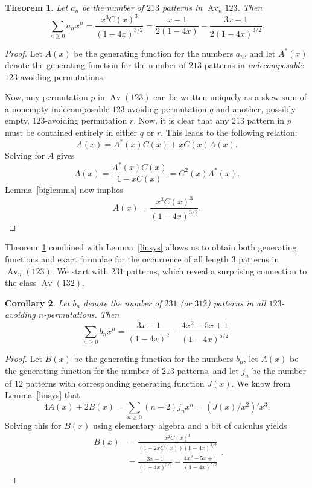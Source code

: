 \documentclass[11pt]{article} %
\theoremstyle{plain}
\newtheorem{theorem}{Theorem}
\newtheorem{corollary}[theorem]{Corollary}
\theoremstyle{definition}
\newcommand{\Avn}{\Av_n(123)}
\DeclareMathOperator{\Av}{Av}
\begin{document}
  \begin{theorem} \label{213pats}
    Let $a_n$ be the number of $213$ patterns in $\Av_n 123$. Then
    $$ \sum_{n\geq 0} a_n x^n = \frac{x^3C(x)^3}{(1-4x)^{3/2}} =
        \frac{x-1}{2(1-4x)} - \frac{3x-1}{2(1-4x)^{3/2}}.$$
  \end{theorem}
  \begin{proof}
    Let $A(x)$ be the generating function for the numbers $a_n$, and
    let $A^*(x)$
    denote the generating function for the number of $213$ patterns in
    \emph{indecomposable} $123$-avoiding permutations.

    Now, any permutation $p$ in $\Av(123)$ can be written uniquely as a
    skew sum of a nonempty indecomposable $123$-avoiding
    permutation $q$ and another, possibly empty, $123$-avoiding
    permutation $r$. Now, it is clear that any $213$ pattern in $p$
    must be contained entirely in either $q$ or $r$. This leads to
    the following relation:
    $$ A(x) = A^*(x)C(x) + xC(x)A(x).$$
    Solving for $A$ gives
    $$ A(x) = \frac{A^*(x) C(x)}{1-xC(x)} = C^2(x) A^*(x).$$
    Lemma~\ref{biglemma} now implies
    $$ A(x) = \frac{x^3 C(x)^3}{(1-4x)^{3/2}}.$$
  \end{proof}

  Theorem~\ref{213pats} combined with Lemma~\ref{linsys} allows us to
  obtain both generating functions and exact formulae for the
  occurrence of all length $3$ patterns in $\Avn$. We start with $231$
  patterns, which reveal a surprising connection to the class $\Av(132)$.

  \begin{corollary} \label{231pats}
    Let $b_n$ denote the number of $231$ (or $312$) patterns in all
    $123$-avoiding $n$-permutations. Then
    $$\sum_{n \geq 0} b_n x^n=
    \frac{3x-1}{(1-4x)^{2}} - \frac{4x^2 - 5x + 1}{(1-4x)^{5/2}}.$$
  \end{corollary}
  \begin{proof}
    Let $B(x)$ be the generating function for the numbers $b_n$, let
    $A(x)$ be the generating function for the number of $213$ patterns,
    and let $j_n$ be the number of $12$ patterns with corresponding
    generating function $J(x)$.
    We know from Lemma~\ref{linsys} that
    $$ 4A(x) + 2B(x) =
      \sum_{n \geq 0} (n-2) j_n x^n = (J(x)/x^2)' x^3.$$
    Solving this for $B(x)$ using elementary algebra and a bit of
    calculus yields
    $$ \begin{aligned}
      B(x) &=  \frac{x^2C(x)^3}{(1 - 2xC(x))(1-4x)^{3/2}} \\
      & = \frac{3x-1}{(1-4x)^{3/2}} - \frac{4x^2 - 5x + 1}{(1-4x)^{5/2}}
    \end{aligned}.$$
  \end{proof}
\end{document}
